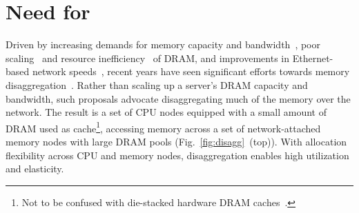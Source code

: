 

\section{Need for \pulse}
\label{sec:overview}


Driven by increasing demands for memory capacity and bandwidth~\cite{scuba, cachelib, tao, memcache, flighttracker, twittercache, spark}, poor scaling~\cite{memscaling2, memscaling3, memscaling1} and resource inefficiency~\cite{infiniswap, memoverprovisioning} of DRAM, and improvements in Ethernet-based network speeds~\cite{terabitethernet, remotememory}, recent years have seen significant efforts towards memory disaggregation~\cite{fastswap, memdisagg1, infiniswap, mind, legoos}. Rather than scaling up a server's DRAM capacity and bandwidth, such proposals advocate disaggregating much of the memory over the network. The result is a set of CPU nodes equipped with a small amount of DRAM used as cache\footnote{Not to be confused with die-stacked hardware DRAM caches~\cite{jevdjic2013stacked, jevdjic2014unison, young2018accord}.}, accessing memory across a set of network-attached memory nodes with large DRAM pools (Fig.~\ref{fig:disagg}~(top)). With allocation flexibility across CPU and memory nodes, disaggregation enables high utilization and elasticity.


